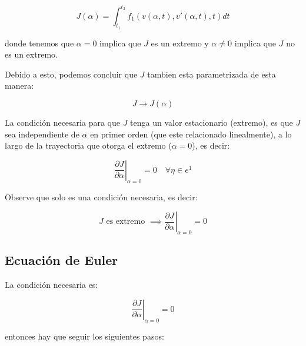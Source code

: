         \begin{equation*}
            J(\alpha) = \int_{t_1}^{t_2} f_1(v(\alpha, t), v'(\alpha, t), t) dt
        \end{equation*}

        donde tenemos que $\alpha = 0$ implica que $J$ es un extremo y $\alpha \ne 0$ implica que $J$ no es un extremo.

        Debido a esto, podemos concluir que $J$ tambien esta parametrizada de esta manera:

        \begin{equation*}
            J \to J(\alpha)
        \end{equation*}

        La condición necesaria para que $J$ tenga un valor estacionario (extremo), es que $J$ sea independiente de $\alpha$ en primer orden (que este relacionado linealmente), a lo largo de la trayectoria que otorga el extremo ($\alpha = 0$), es decir:

        \begin{equation}
            \left. \frac{\partial J}{\partial \alpha} \right|_{\alpha=0} = 0 \quad \forall \eta \in e^1
        \end{equation}

        \begin{nota}
            Observe que solo es una condición necesaria, es decir:

            \begin{equation*}
                J \text{ es extremo } \implies \left. \frac{\partial J}{\partial \alpha} \right|_{\alpha=0} = 0
            \end{equation*}
        \end{nota}


        \subsection{Ecuación de Euler}

            La condición necesaria es:

            \begin{equation*}
                \left. \frac{\partial J}{\partial \alpha} \right|_{\alpha=0} = 0
            \end{equation*}

            entonces hay que seguir los siguientes pasos:

